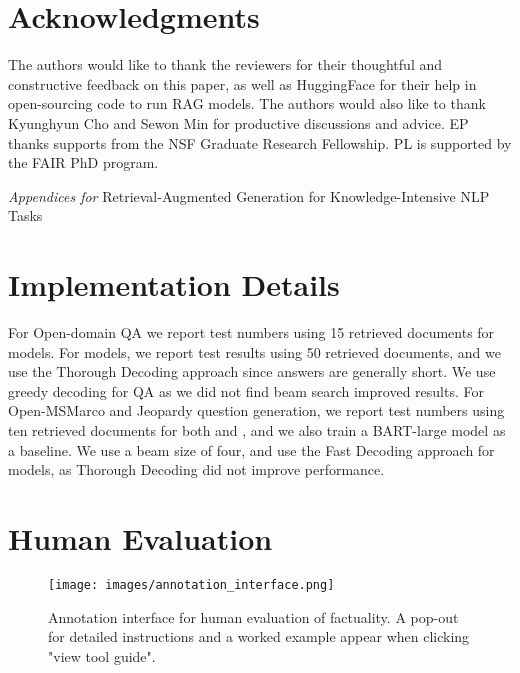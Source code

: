 \documentclass{article}
\begin{document}
\section*{Acknowledgments}
The authors would like to thank the reviewers for their thoughtful and constructive feedback on this paper, as well as HuggingFace for their help in open-sourcing code to run RAG models.
The authors would also like to thank Kyunghyun Cho and Sewon Min for productive discussions and advice.
EP thanks supports from the NSF Graduate Research Fellowship. PL is supported by the FAIR PhD program.





\clearpage

\appendix

\begin{center}
\Large \emph{Appendices for}
{\Large Retrieval-Augmented Generation for Knowledge-Intensive NLP Tasks}\\
\bigskip
\end{center}

\section{Implementation Details}
For Open-domain QA we report test numbers using 15 retrieved documents for \ragtoken{} models. For \raganswer{} models, we report test results using 50 retrieved documents, and we use the Thorough Decoding approach since answers are generally short. We use greedy decoding for QA as we did not find beam search improved results. For Open-MSMarco and Jeopardy question generation, we report test numbers using ten retrieved documents for both \ragtoken{} and \raganswer{}, and we also train a BART-large model as a baseline. We use a beam size of four, and use the Fast Decoding approach for \raganswer{} models, as Thorough Decoding did not improve performance.






\section{Human Evaluation}
\begin{figure}[h]
\centering

  \texttt{[image: images/annotation\_interface.png]}
\caption{Annotation interface for human evaluation of factuality. A pop-out for detailed instructions and a worked example appear when clicking "view tool guide".}
  \label{fig:annot}
\end{figure}
\end{document}
